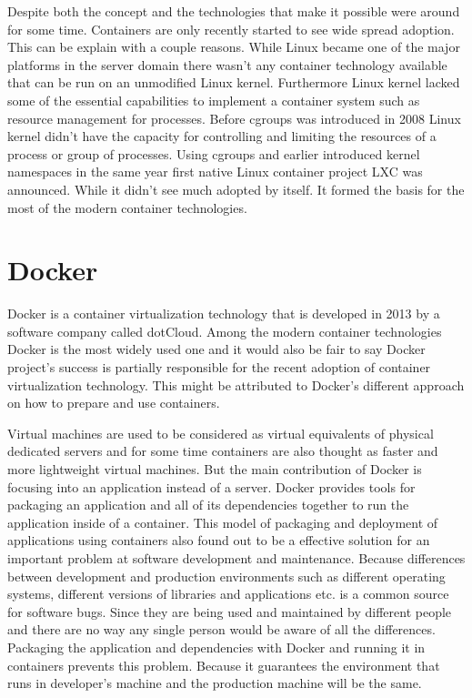 \documentclass[12pt,oneandhalf,chaparabic,ceng,ms,eng,oneside,pntc]{gsufbe}
\begin{document}
Despite both the concept and the technologies that make it possible were around for some time.
Containers are only recently started to see wide spread adoption. This can be explain with a couple
reasons. While Linux became one of the major platforms in the server domain there wasn't any container
technology available that can be run on an unmodified Linux kernel. Furthermore Linux kernel lacked
some of the essential capabilities to implement a container system such as resource management for
processes. Before cgroups was introduced in 2008 Linux kernel didn't have the capacity for controlling
and limiting the resources of a process or group of processes. Using cgroups and earlier introduced
kernel namespaces in the same year first native Linux
container project LXC was announced. While it didn't see much adopted by itself. It formed the basis
for the most of the modern container technologies.

\section{Docker}
Docker is a container virtualization technology that is developed in 2013 by a software company called
dotCloud. Among the modern container technologies Docker is the most widely used one and it would also
be fair to say Docker project's success is partially responsible for the recent adoption of container
virtualization technology. This might be attributed to Docker's different approach on how to prepare 
and use containers.

Virtual machines are used to be considered as virtual equivalents of physical dedicated servers and for
some time containers are also thought as faster and more lightweight virtual machines. But the main
contribution of Docker is focusing into an application instead of a server. Docker provides tools for
packaging an application and all of its dependencies together to run the application inside of a
container. This model of packaging and deployment of applications using containers also found out to be
a effective solution for an important problem at software development and maintenance. Because 
differences between development and production environments such as different operating systems, 
different versions of libraries and applications etc. is a common source for software bugs. Since they
are being used and  maintained by different people and there are no way any single person would be
aware of all the differences. Packaging the application and dependencies with Docker and running it in
containers prevents this problem. Because it guarantees the environment that runs in developer’s
machine and the production machine will be the same.
\end{document}
